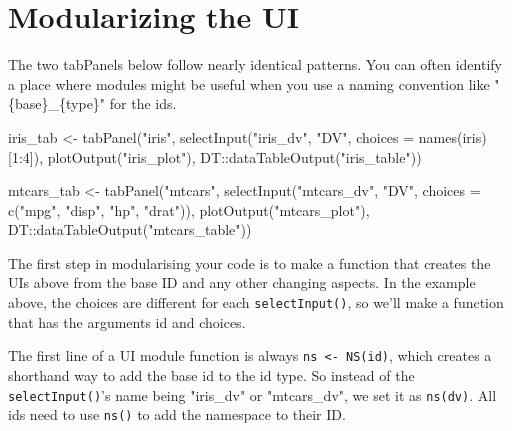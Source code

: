 \documentclass[
  oneside]{book}
\newenvironment{Shaded}{\begin{snugshade}}{\end{snugshade}}
\newcommand{\AttributeTok}[1]{\textcolor[rgb]{0.77,0.63,0.00}{#1}}
\newcommand{\DecValTok}[1]{\textcolor[rgb]{0.00,0.00,0.81}{#1}}
\newcommand{\FunctionTok}[1]{\textcolor[rgb]{0.00,0.00,0.00}{#1}}
\newcommand{\NormalTok}[1]{#1}
\newcommand{\OtherTok}[1]{\textcolor[rgb]{0.56,0.35,0.01}{#1}}
\newcommand{\SpecialCharTok}[1]{\textcolor[rgb]{0.00,0.00,0.00}{#1}}
\newcommand{\StringTok}[1]{\textcolor[rgb]{0.31,0.60,0.02}{#1}}
\begin{document}
\hypertarget{modularizing-the-ui}{%
\section{Modularizing the UI}\label{modularizing-the-ui}}

The two tabPanels below follow nearly identical patterns. You can often identify a place where modules might be useful when you use a naming convention like \StringTok{"\{base\}\_\{type\}"} for the \AttributeTok{id}s.

\begin{Shaded}
\begin{Highlighting}[]
\NormalTok{iris\_tab }\OtherTok{\textless{}{-}} \FunctionTok{tabPanel}\NormalTok{(}\StringTok{"iris"}\NormalTok{, }\FunctionTok{selectInput}\NormalTok{(}\StringTok{"iris\_dv"}\NormalTok{, }\StringTok{"DV"}\NormalTok{, }\AttributeTok{choices =} \FunctionTok{names}\NormalTok{(iris)[}\DecValTok{1}\SpecialCharTok{:}\DecValTok{4}\NormalTok{]),}
    \FunctionTok{plotOutput}\NormalTok{(}\StringTok{"iris\_plot"}\NormalTok{), DT}\SpecialCharTok{::}\FunctionTok{dataTableOutput}\NormalTok{(}\StringTok{"iris\_table"}\NormalTok{))}

\NormalTok{mtcars\_tab }\OtherTok{\textless{}{-}} \FunctionTok{tabPanel}\NormalTok{(}\StringTok{"mtcars"}\NormalTok{, }\FunctionTok{selectInput}\NormalTok{(}\StringTok{"mtcars\_dv"}\NormalTok{, }\StringTok{"DV"}\NormalTok{, }\AttributeTok{choices =} \FunctionTok{c}\NormalTok{(}\StringTok{"mpg"}\NormalTok{,}
    \StringTok{"disp"}\NormalTok{, }\StringTok{"hp"}\NormalTok{, }\StringTok{"drat"}\NormalTok{)), }\FunctionTok{plotOutput}\NormalTok{(}\StringTok{"mtcars\_plot"}\NormalTok{), DT}\SpecialCharTok{::}\FunctionTok{dataTableOutput}\NormalTok{(}\StringTok{"mtcars\_table"}\NormalTok{))}
\end{Highlighting}
\end{Shaded}

The first step in modularising your code is to make a function that creates the UIs above from the base ID and any other changing aspects. In the example above, the choices are different for each \texttt{selectInput}\texttt{()}, so we'll make a function that has the arguments \AttributeTok{id} and \AttributeTok{choices}.

The first line of a UI module function is always \texttt{ns\ \textless{}-\ NS(id)}, which creates a shorthand way to add the base id to the id type. So instead of the \texttt{selectInput}\texttt{()}'s name being \StringTok{"iris\_dv"} or \StringTok{"mtcars\_dv"}, we set it as \texttt{ns}\texttt{(dv)}. All ids need to use \texttt{ns}\texttt{()} to add the namespace to their ID.
\end{document}
